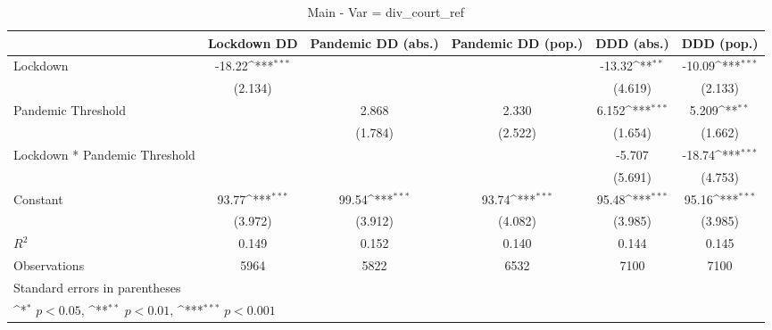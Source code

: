 \documentclass{article}
\begin{document}
{
\def\sym#1{\ifmmode^{#1}\else\(^{#1}\)\fi}
\begin{longtable}{l*{5}{c}}
\caption{Main - Var = div\_court\_ref}\\
\hline\hline\endfirsthead\hline\endhead\hline\endfoot\endlastfoot
                &\multicolumn{1}{c}{Lockdown DD}&\multicolumn{1}{c}{Pandemic DD (abs.)}&\multicolumn{1}{c}{Pandemic DD (pop.)}&\multicolumn{1}{c}{DDD (abs.)}&\multicolumn{1}{c}{DDD (pop.)}\\
\hline
Lockdown        &   -18.22\sym{***}&                  &                  &   -13.32\sym{**} &   -10.09\sym{***}\\
                &  (2.134)         &                  &                  &  (4.619)         &  (2.133)         \\
Pandemic Threshold&                  &    2.868         &    2.330         &    6.152\sym{***}&    5.209\sym{**} \\
                &                  &  (1.784)         &  (2.522)         &  (1.654)         &  (1.662)         \\
Lockdown * Pandemic Threshold&                  &                  &                  &   -5.707         &   -18.74\sym{***}\\
                &                  &                  &                  &  (5.691)         &  (4.753)         \\
Constant        &    93.77\sym{***}&    99.54\sym{***}&    93.74\sym{***}&    95.48\sym{***}&    95.16\sym{***}\\
                &  (3.972)         &  (3.912)         &  (4.082)         &  (3.985)         &  (3.985)         \\
\hline
\(R^{2}\)       &    0.149         &    0.152         &    0.140         &    0.144         &    0.145         \\
Observations    &     5964         &     5822         &     6532         &     7100         &     7100         \\
\hline\hline
\multicolumn{6}{l}{\footnotesize Standard errors in parentheses}\\
\multicolumn{6}{l}{\footnotesize \sym{*} \(p<0.05\), \sym{**} \(p<0.01\), \sym{***} \(p<0.001\)}\\
\end{longtable}
}
\end{document}
